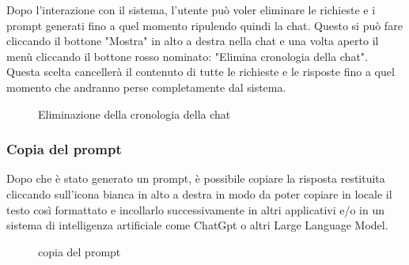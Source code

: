 Dopo l'interazione con il sistema, l'utente può voler eliminare le richieste e i prompt generati fino a quel momento ripulendo quindi la chat. Questo si può fare cliccando il bottone "Mostra" in alto a destra nella chat e una volta aperto il menù cliccando il bottone rosso nominato: "Elimina cronologia della chat". Questa scelta cancellerà il contenuto di tutte le richieste e le risposte fino a quel momento che andranno perse completamente dal sistema.

\begin{figure}[H]
  \centering
  \caption{Eliminazione della cronologia della chat}
\end{figure}

\subsubsection{Copia del prompt}

Dopo che è stato generato un prompt, è possibile copiare la risposta restituita cliccando sull'icona bianca in alto a destra in modo da poter copiare in locale il testo così formattato e incollarlo successivamente in altri applicativi e/o in un sistema di intelligenza artificiale come ChatGpt o altri Large Language Model.

\begin{figure}[H]
    \centering
    \caption{copia del prompt}
  \end{figure}